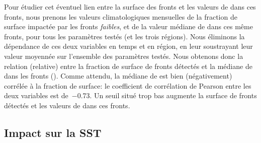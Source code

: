 Pour étudier cet éventuel lien entre la surface des fronts et les valeurs de  dans ces fronts, nous prenons les valeurs climatologiques mensuelles de la fraction de surface impactée par les fronts \emph{faibles}, et de la valeur médiane de  dans ces même fronts, pour tous les paramètres testés (et les trois régions).
Nous éliminons la dépendance de ces deux variables en temps et en région, en leur soustrayant leur valeur moyennée sur l'ensemble des paramètres testés.
Nous obtenons donc la relation (relative) entre la fraction de surface de fronts détectés et la médiane de  dans les fronts ().
Comme attendu, la médiane de  est bien (négativement) corrélée à la fraction de surface: le coefficient de corrélation de Pearson entre les deux variables est de~\num{-0.73}.
Un seuil situé trop bas augmente la surface de fronts détectés et  les valeurs de  dans ces fronts.

\begin{figure}
  \centering
  \label{fig:sensibilite-surface}
\end{figure}


\subsection{Impact sur la SST}
\label{sec:res-sst}

